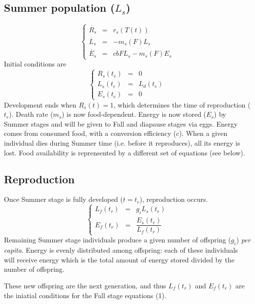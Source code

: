 \documentclass[12 pt]{article}
\begin{document}
\subsection{Summer population ($L_s$)}
\begin{equation}
    \left \lbrace
    \begin{array}{lcl}
        \Dot{R_s} & = & r_s(T(t)) \\
        \Dot{L_s} & = & - m_s(F)L_s \\
        \Dot{E_s} & = & c bFL_s -m_s(F)E_s 
    \end{array} \right .
\end{equation}
Initial conditions are
\begin{equation}
    \left \lbrace
    \begin{array}{lcl}
	R_s(t_e) & = & 0 \\
	L_s(t_e) & = & L_d(t_e) \\
	E_s(t_e) & = & 0	
    \end{array} \right .
\end{equation}
Development ends when $R_s(t) = 1$, which determines the time of reproduction ($t_r$). %
Death rate ($m_s$) is now food-dependent. Energy is now stored ($E_s$) by Summer stages and will be given to Fall and diapause stages via eggs. Energy comes from consumed food, with a conversion efficiency ($c$). When a given individual dies during Summer time (i.e. before it reproduces), all its energy is lost. Food availability is reprensented by a different set of equations (see below). \par

\subsection{Reproduction}
Once Summer stage is fully developed ($t=t_r$), reproduction occurs. 
\begin{equation}
    \left \lbrace
    \begin{array}{lcl}
        L_f(t_r) & = & g_i L_s(t_r) \\
        E_f (t_r) & = & \dfrac{E_s (t_r)}{L_f(t_r)}
    \end{array} \right .
\end{equation}
Remaining Summer stage individuals produce a given number of offspring ($g_i$) \textit{per capita}. Energy is evenly distributed among offspring: each of these individuals will receive energy which is the total amount of energy stored divided by the number of offspring. \par
These new offspring are the next generation, and thus $L_f (t_r)$ and $E_f (t_r)$ are the iniatial conditions for the Fall stage equations (1). 
\end{document}
